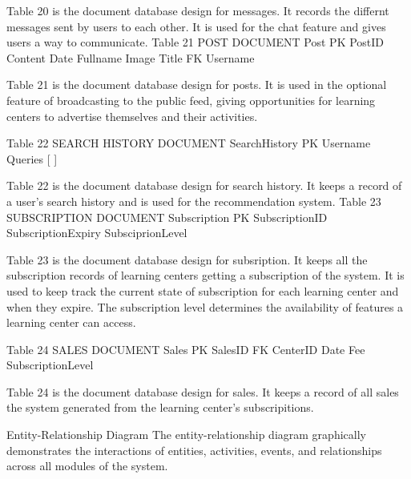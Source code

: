 Table 20 is the document database design for messages. It records the differnt messages sent by users to each other. It is used for the chat feature and gives users a way to communicate.
Table 21
POST DOCUMENT
Post
PK	PostID
 	Content
 	Date
 	Fullname
 	Image
 	Title
FK	Username

Table 21 is the document database design for posts. It is used in the optional feature of broadcasting to the public feed, giving opportunities for learning centers to advertise themselves and their activities.




Table 22
SEARCH HISTORY DOCUMENT
SearchHistory
PK	Username
 	Queries [ ]

Table 22 is the document database design for search history. It keeps a record of a user’s search history and is used for the recommendation system.
Table 23
SUBSCRIPTION  DOCUMENT
Subscription
PK	SubscriptionID
 	SubscriptionExpiry
 	SubsciprionLevel

Table 23 is the document database design for subsription. It keeps all the subscription records of learning centers getting a subscription of the system. It is used to keep track the current state of subscription for each learning center and when they expire. The subscription level determines the availability of features a learning center can access.

Table 24
SALES  DOCUMENT
Sales
PK	SalesID
FK	CenterID
 	Date
 	Fee
 	SubscriptionLevel

Table 24 is the document database design for sales. It keeps a record of all sales the system generated from the learning center’s subscripitions.



Entity-Relationship Diagram
The entity-relationship diagram graphically demonstrates the interactions of entities, activities, events, and relationships across all modules of the system.
 
